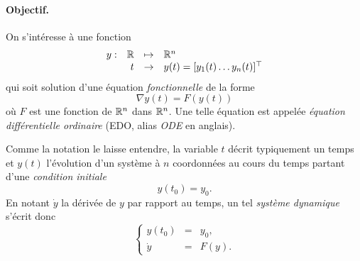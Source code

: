 

\paragraph*{Objectif.} 
On s'intéresse à une fonction 
$$
\begin{array}{rrcl}
  y : & \mathbb{R} & \mapsto & \mathbb{R}^n \\
  & t & \to & y(t) = [y_1(t) \dots y_n(t)]^\top 
\end{array}
$$
qui soit solution d'une équation {\em fonctionnelle} de la forme
$$
\nabla y(t) = F(y(t))
$$
où $F$ est une fonction de $\mathbb{R}^n$ dans $\mathbb{R}^n$. Une telle équation est appelée {\em équation différentielle ordinaire} (EDO, alias {\em ODE} en anglais).

Comme la notation le laisse entendre, la variable $t$ décrit typiquement un temps et $y(t)$ l'évolution d'un système à $n$ coordonnées au cours du temps partant d'une {\em condition initiale}
$$
y(t_0) = y_0.
$$
En notant $\dot y$ la dérivée de $y$ par rapport au temps, un tel {\em système dynamique} s'écrit donc
$$
\left\{\begin{array}{rcl}
        y(t_0) & = & y_0, \\
        \dot y & = & F(y).
       \end{array}\right.
$$

